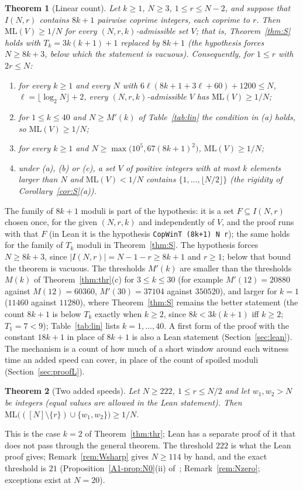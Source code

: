\documentclass[11pt]{article}
\newtheorem{theorem}{Theorem}[section]
\theoremstyle{definition}
\theoremstyle{remark}
\newcommand{\ML}{\mathrm{ML}}
\newcommand{\xA}[1]{\ref{A1-#1}}
\begin{document}
\begin{theorem}[Linear count]\label{thm:L}
Let $k\ge1$, $N\ge3$, $1\le r\le N-2$, and suppose that $I(N,r)$ contains $8k+1$ pairwise coprime integers, each coprime to $r$. Then $\ML(V)\ge1/N$ for every $(N,r,k)$-admissible set $V$; that is, Theorem~\ref{thm:S} holds with $T_k=3k(k+1)+1$ replaced by $8k+1$ (the hypothesis forces $N\ge8k+3$, below which the statement is vacuous). Consequently, for $1\le r$ with $2r\le N$:
\begin{enumerate}[label=(\alph*),nosep]
\item for every $k\ge1$ and every $N$ with $6\ell(8k+1+3\ell+60)+1200\le N$, $\ell=\lfloor\log_2N\rfloor+2$, every $(N,r,k)$-admissible $V$ has $\ML(V)\ge1/N$;
\item for $1\le k\le40$ and $N\ge M'(k)$ of Table~\ref{tab:lin} the condition in (a) holds, so $\ML(V)\ge1/N$;
\item for every $k\ge1$ and $N\ge\max\bigl(10^5,67(8k+1)^2\bigr)$, $\ML(V)\ge1/N$;
\item under (a), (b) or (c), a set $V$ of positive integers with at most $k$ elements larger than $N$ and $\ML(V)<1/N$ contains $\{1,\dots,\lfloor N/2\rfloor\}$ (the rigidity of Corollary~\ref{cor:S}(a)).
\end{enumerate}
\end{theorem}
The family of $8k+1$ moduli is part of the hypothesis: it is a set $F\subseteq I(N,r)$ chosen once, for the given $(N,r,k)$ and independently of $V$, and the proof runs with that $F$ (in Lean it is the hypothesis \texttt{CopWinT (8k+1) N r}); the same holds for the family of $T_k$ moduli in Theorem~\ref{thm:S}. The hypothesis forces $N\ge8k+3$, since $|I(N,r)|=N-1-r\ge8k+1$ and $r\ge1$; below that bound the theorem is vacuous. The thresholds $M'(k)$ are smaller than the thresholds $M(k)$ of Theorem~\ref{thm:thr}(c) for $3\le k\le30$ (for example $M'(12)=20880$ against $M(12)=60360$, $M'(30)=37104$ against $350520$), and larger for $k=1$ ($11460$ against $11280$), where Theorem~\ref{thm:S} remains the better statement (the count $8k+1$ is below $T_k$ exactly when $k\ge2$, since $8k<3k(k+1)$ iff $k\ge2$; $T_1=7<9$); Table~\ref{tab:lin} lists $k=1,\dots,40$. A first form of the proof with the constant $18k+1$ in place of $8k+1$ is also a Lean statement (Section~\ref{sec:lean}). The mechanism is a count of how much of a short window around each witness time an added speed can cover, in place of the count of spoiled moduli (Section~\ref{sec:proofL}).

\begin{theorem}[Two added speeds]\label{thm:W}
Let $N\ge222$, $1\le r\le N/2$ and let $w_1,w_2>N$ be integers (equal values are allowed in the Lean statement). Then $\ML\bigl(([N]\setminus\{r\})\cup\{w_1,w_2\}\bigr)\ge1/N$.
\end{theorem}
This is the case $k=2$ of Theorem~\ref{thm:thr}; Lean has a separate proof of it that does not pass through the general theorem. The threshold $222$ is what the Lean proof gives; Remark~\ref{rem:Wsharp} gives $N\ge114$ by hand, and the exact threshold is $21$ (Proposition~\xA{prop:N0}(ii) of~\cite{A1}; Remark~\ref{rem:Nzero}; exceptions exist at $N=20$).
\end{document}
